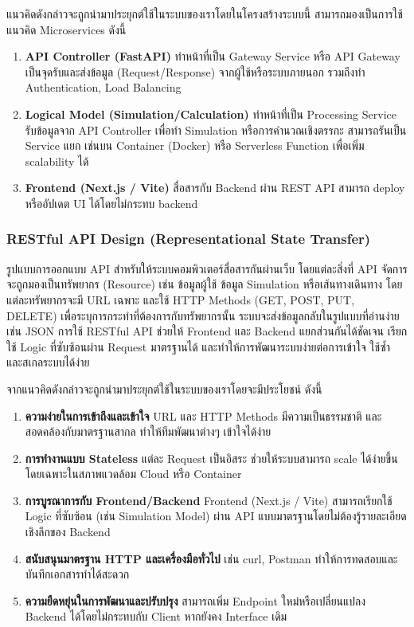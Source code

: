 \indent แนวคิดดังกล่าวจะถูกนํามาประยุกต์ใช้ในระบบของเราโดยในโครงสร้างระบบนี้ สามารถมองเป็นการใช้แนวคิด Microservices ดังนี้
\begin{enumerate}
    \item \textbf{API Controller (FastAPI)}  
    ทำหน้าที่เป็น Gateway Service หรือ API Gateway เป็นจุดรับและส่งข้อมูล (Request/Response) จากผู้ใช้หรือระบบภายนอก รวมถึงทำ Authentication, Load Balancing
    \item \textbf{Logical Model (Simulation/Calculation)}  
    ทำหน้าที่เป็น Processing Service รับข้อมูลจาก API Controller เพื่อทำ Simulation หรือการคำนวณเชิงตรรกะ สามารถรันเป็น Service แยก เช่นบน Container (Docker) หรือ Serverless Function เพื่อเพิ่ม scalability ได้
    \item \textbf{Frontend (Next.js / Vite)}  
    สื่อสารกับ Backend ผ่าน REST API สามารถ deploy หรืออัปเดต UI ได้โดยไม่กระทบ backend
\end{enumerate}

\subsubsection{RESTful API Design (Representational State Transfer)}
\indent รูปแบบการออกแบบ API สำหรับให้ระบบคอมพิวเตอร์สื่อสารกันผ่านเว็บ 
โดยแต่ละสิ่งที่ API จัดการจะถูกมองเป็นทรัพยากร (Resource) 
เช่น ข้อมูลผู้ใช้ ข้อมูล Simulation หรือเส้นทางเดินทาง โดยแต่ละทรัพยากรจะมี URL เฉพาะ 
และใช้ HTTP Methods (GET, POST, PUT, DELETE) เพื่อระบุการกระทำที่ต้องการกับทรัพยากรนั้น 
ระบบจะส่งข้อมูลกลับในรูปแบบที่อ่านง่าย เช่น JSON การใช้ RESTful API ช่วยให้ Frontend 
และ Backend แยกส่วนกันได้ชัดเจน เรียกใช้ Logic ที่ซับซ้อนผ่าน Request มาตรฐานได้ 
และทำให้การพัฒนาระบบง่ายต่อการเข้าใจ ใช้ซ้ำ และสเกลระบบได้ง่าย

\indent จากแนวคิดดังกล่าวจะถูกนํามาประยุกต์ใช้ในระบบของเราโดยจะมีประโยชน์ ดังนี้
\begin{enumerate}
    \item \textbf{ความง่ายในการเข้าถึงและเข้าใจ}  
    URL และ HTTP Methods มีความเป็นธรรมชาติ และสอดคล้องกับมาตรฐานสากล ทำให้ทีมพัฒนาต่างๆ เข้าใจได้ง่าย
    \item \textbf{การทำงานแบบ Stateless}  
    แต่ละ Request เป็นอิสระ ช่วยให้ระบบสามารถ scale ได้ง่ายขึ้น โดยเฉพาะในสภาพแวดล้อม Cloud หรือ Container
    \item \textbf{การบูรณาการกับ Frontend/Backend}  
    Frontend (Next.js / Vite) สามารถเรียกใช้ Logic ที่ซับซ้อน (เช่น Simulation Model) ผ่าน API แบบมาตรฐานโดยไม่ต้องรู้รายละเอียดเชิงลึกของ Backend
    \item \textbf{สนับสนุนมาตรฐาน HTTP และเครื่องมือทั่วไป}  
    เช่น curl, Postman ทำให้การทดสอบและบันทึกเอกสารทำได้สะดวก
    \item \textbf{ความยืดหยุ่นในการพัฒนาและปรับปรุง}  
    สามารถเพิ่ม Endpoint ใหม่หรือเปลี่ยนแปลง Backend ได้โดยไม่กระทบกับ Client หากยังคง Interface เดิม
\end{enumerate}

